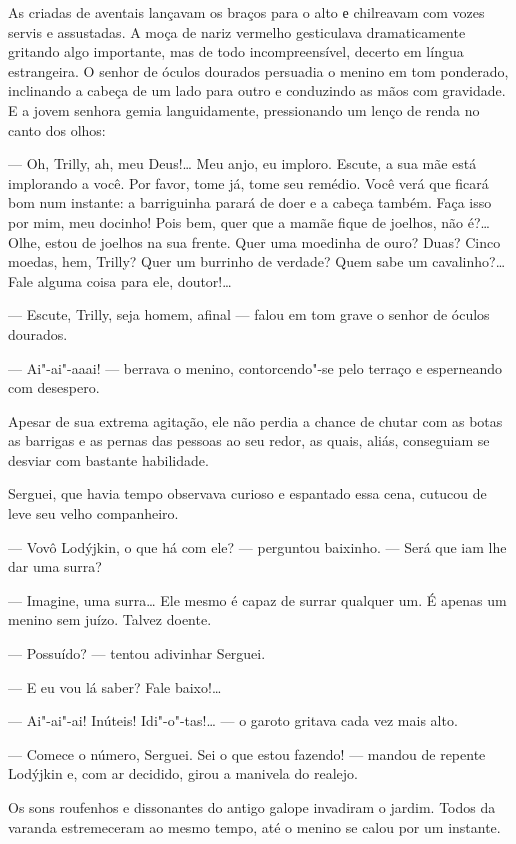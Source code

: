 As criadas de aventais lançavam os braços para o alto е chilreavam com
vozes servis e assustadas. A moça de nariz vermelho gesticulava
dramaticamente gritando algo importante, mas de todo incompreensível, decerto em língua estrangeira. O senhor de óculos
dourados persuadia o menino em tom ponderado, inclinando a cabeça de um
lado para outro e conduzindo as mãos com gravidade. E a jovem senhora
gemia languidamente, pressionando um lenço de renda no canto dos olhos:

--- Oh, Trilly, ah, meu Deus!\ldots{} Meu anjo, eu imploro. Escute, a sua mãe
está implorando a você. Por favor, tome já, tome seu remédio. Você verá
que ficará bom num instante: a barriguinha parará de doer e a cabeça
também. Faça isso por mim, meu docinho! Pois bem, quer que a mamãe fique
de joelhos, não é?\ldots{} Olhe, estou de joelhos na sua frente. Quer uma
moedinha de ouro? Duas? Cinco moedas, hem, Trilly? Quer um burrinho
de verdade? Quem sabe um cavalinho?\ldots{} Fale alguma coisa para ele,
doutor!\ldots{}

--- Escute, Trilly, seja homem, afinal --- falou em tom grave o senhor
de óculos dourados.

--- Ai"-ai"-aaai! --- berrava o menino, contorcendo"-se pelo terraço e
esperneando com desespero.

Apesar de sua extrema agitação, ele não perdia a chance de chutar com as
botas as barrigas e as pernas das pessoas ao seu redor, as quais, aliás,
conseguiam se desviar com bastante habilidade.

Serguei, que havia tempo observava curioso e espantado essa cena,
cutucou de leve seu velho companheiro.

--- Vovô Lodýjkin, o que há com ele? --- perguntou baixinho. --- Será
que iam lhe dar uma surra?

--- Imagine, uma surra\ldots{} Ele mesmo é capaz de surrar qualquer um. É
apenas um menino sem juízo. Talvez doente.

--- Possuído? --- tentou adivinhar Serguei.

--- E eu vou lá saber? Fale baixo!\ldots{}

--- Ai"-ai"-ai! Inúteis! Idi"-o"-tas!\ldots{} --- o garoto gritava cada vez mais
alto.

--- Comece o número, Serguei. Sei o que estou fazendo! --- mandou de
repente Lodýjkin e, com ar decidido, girou a manivela do realejo.

Os sons roufenhos e dissonantes do antigo galope invadiram o jardim.
Todos da varanda estremeceram ao mesmo tempo, até o menino se calou por
um instante.

